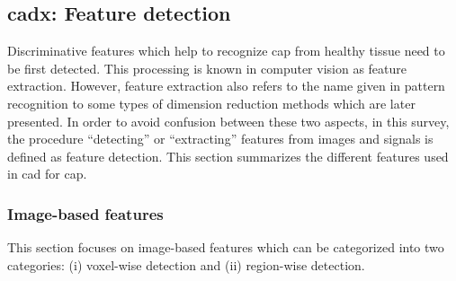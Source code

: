 \subsection{\acs*{cadx}: Feature detection} \label{subsec:chp3:img-clas:CADX-fea-dec}

Discriminative features which help to recognize \ac{cap} from healthy tissue
need to be first detected.
This processing is known in computer vision as feature extraction.
However, feature extraction also refers to the name given in pattern
recognition to some types of dimension reduction methods which are later
presented.
In order to avoid confusion between these two aspects, in this survey, the
procedure ``detecting'' or ``extracting'' features from images and signals is
defined as feature detection.
This section summarizes the different features used in \ac{cad} for \ac{cap}.

\subsubsection{Image-based features}\label{subsubsec:chp3:img-clas:CADX-fea-dec:Img-fea}

This section focuses on image-based features which can be categorized into two
categories: (i) voxel-wise detection and (ii) region-wise detection.

